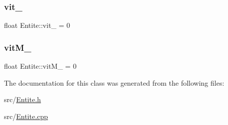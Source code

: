 \subsubsection{\texorpdfstring{vit\+\_\+}{vit\_}}
{\footnotesize\ttfamily float Entite\+::vit\+\_\+ = 0\hspace{0.3cm}{\ttfamily [protected]}}

\mbox{\label{class_entite_ac5f9e68aa96316c6871e1980766977a9}} 
\subsubsection{\texorpdfstring{vit\+M\+\_\+}{vitM\_}}
{\footnotesize\ttfamily float Entite\+::vit\+M\+\_\+ = 0\hspace{0.3cm}{\ttfamily [protected]}}



The documentation for this class was generated from the following files\+:\begin{DoxyCompactItemize}
\item 
src/\mbox{\hyperlink{_entite_8h}{Entite.\+h}}\item 
src/\mbox{\hyperlink{_entite_8cpp}{Entite.\+cpp}}\end{DoxyCompactItemize}
